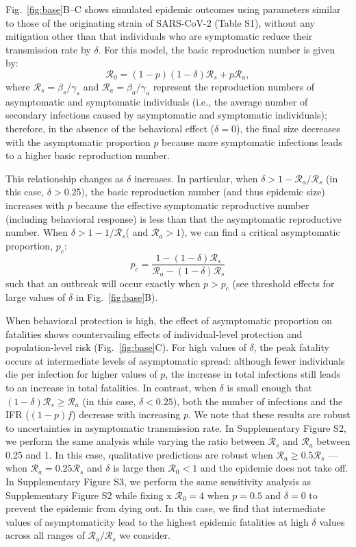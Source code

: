 \documentclass[12pt]{article}
\newcommand{\fref}[1]{Fig.~\ref{fig:#1}}
\newcommand{\RR}{\ensuremath{{\mathcal R}}\xspace}
\begin{document}
\fref{base}B--C shows simulated epidemic outcomes using parameters similar to those of the originating strain of SARS-CoV-2 (Table S1), without any mitigation other than that individuals who are symptomatic reduce their transmission rate by $\delta$. 
For this model, the basic reproduction number is given by:
\begin{equation}
\RR_0 = (1-p) (1-\delta) \RR_s + p \RR_a,
\end{equation}
where $\RR_s = \beta_s/\gamma_s$ and $\RR_a = \beta_a/\gamma_a$ represent the reproduction numbers of asymptomatic and symptomatic individuals (i.e., the average number of secondary infections caused by asymptomatic and symptomatic individuals);
therefore, in the absence of the behavioral effect ($\delta=0$), the final size decreases with the asymptomatic proportion $p$ because more symptomatic infections leads to a higher basic reproduction number.

This relationship changes as $\delta$ increases.
In particular, when $\delta > 1-\RR_a/\RR_s$ (in this case, $\delta > 0.25)$, the basic reproduction number (and thus epidemic size) increases with $p$ because the effective symptomatic reproductive number (including behavioral response) is less than that the asymptomatic reproductive number.
When $\delta > 1-1/\RR_s$( and $\RR_a>1$), we can find a critical asymptomatic proportion, $p_c$:
\begin{equation}
    p_c = \frac{1 - (1-\delta) \RR_s}{\RR_a - (1-\delta) \RR_s}
\end{equation}
such that an outbreak will occur exactly when $p>p_c$ (see threshold effects for large values of $\delta$ in \fref{base}B).

When behavioral protection is high, the effect of asymptomatic proportion on fatalities shows countervailing effects of individual-level protection and population-level risk (\fref{base}C).
For high values of $\delta$, the peak fatality occurs at intermediate levels of asymptomatic spread:
although fewer individuals die per infection for higher values of $p$, the increase in total infections still leads to an increase in total fatalities.
In contrast, when $\delta$ is small enough that $(1-\delta) \RR_s \geq \RR_a$ (in this case, $\delta < 0.25$), both the number of infections and the IFR ($(1-p)f$) decrease with increasing $p$.
We note that these results are robust to uncertainties in asymptomatic transmission rate.
In Supplementary Figure S2, we perform the same analysis while varying the ratio between $\RR_s$ and $\RR_a$ between 0.25 and 1.
In this case, qualitative predictions are robust when $\RR_a \geq 0.5 \RR_s$
--- when $\RR_a = 0.25 \RR_s$ and $\delta$ is large then $\RR_0 < 1$ and the epidemic does not take off.
In Supplementary Figure S3, we perform the same sensitivity analysis as Supplementary Figure S2 while fixing x $\RR_0 = 4$ when $p=0.5$ and $\delta=0$ to prevent the epidemic from dying out. In this case, we find that intermediate values of asymptomaticity lead to the highest epidemic fatalities at high $\delta$ values across all ranges of $\RR_a/\RR_s$ we consider.
\end{document}

